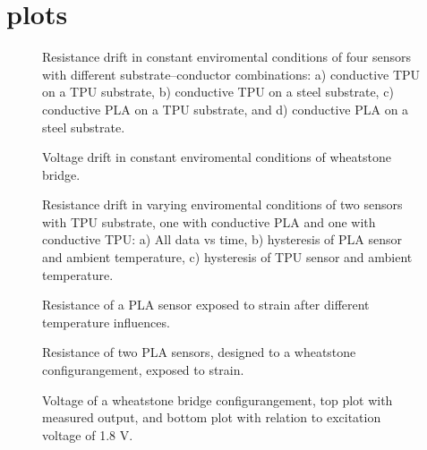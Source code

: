 \section{plots}



\begin{figure}[H]
\centering

    \caption{Resistance drift in constant enviromental conditions of four sensors with different substrate–conductor combinations: a) conductive TPU on a TPU substrate, b) conductive TPU on a steel substrate, c) conductive PLA on a TPU substrate, and d) conductive PLA on a steel substrate.}
    \label{fig:2by2_drift}
\end{figure}

\begin{figure}[H]
\centering

    \caption{Voltage drift in constant enviromental conditions of wheatstone bridge.}
    \label{fig:Wheatstone_drift}
\end{figure}

\begin{figure}[H]
\centering

    \caption{Resistance drift in varying enviromental conditions of two sensors with TPU substrate, one with conductive PLA and one with conductive TPU: a) All data vs time, b) hysteresis of PLA sensor and ambient temperature, c) hysteresis of TPU sensor and ambient temperature.}
    \label{fig:TPUvsPLA_neg_deg}
\end{figure}

\begin{figure}[H]
\centering

    \caption{Resistance of a PLA sensor exposed to strain after different temperature influences.}
    \label{fig:PLA_after_temp_limits}
\end{figure}

\begin{figure}[H]
\centering

    \caption{Resistance of two PLA sensors, designed to a wheatstone configurangement, exposed to strain.}
    \label{fig:Wheatstone_sensorer}
\end{figure}

\begin{figure}[H]
\centering

    \caption{Voltage of a wheatstone bridge configurangement, top plot with measured output, and bottom plot with relation to excitation voltage of 1.8 V.}
    \label{fig:Wheatstone1}
\end{figure}